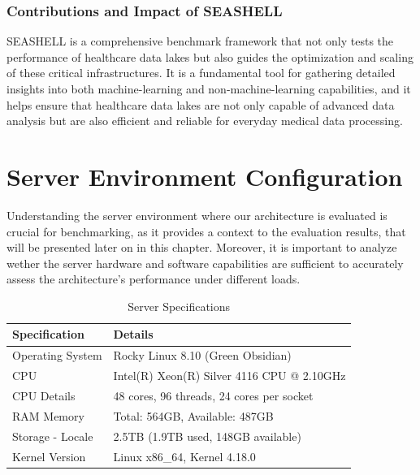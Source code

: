 \subsubsection{Contributions and Impact of SEASHELL}
SEASHELL is a comprehensive benchmark framework that not only tests the performance of healthcare data lakes but also guides the optimization and scaling of these critical infrastructures. It is a fundamental tool for gathering detailed insights into both machine-learning and non-machine-learning capabilities, and it helps ensure that healthcare data lakes are not only capable of advanced data analysis but are also efficient and reliable for everyday medical data processing.


\section{Server Environment Configuration}

Understanding the server environment where our architecture is evaluated is crucial for benchmarking, as it provides a context to the evaluation results, that will be presented later on in this chapter. Moreover, it is important to analyze wether the server hardware and software capabilities are sufficient to accurately assess the architecture's performance under different loads.

\begin{table}[h!]
    \centering
    \begin{tabular}{| P{0.47\textwidth} | P{0.47\textwidth} |}
    \hline
    \textbf{Specification}         & \textbf{Details}                         \\ \hline
    Operating System               & Rocky Linux 8.10 (Green Obsidian)        \\ \hline
    CPU                            & Intel(R) Xeon(R) Silver 4116 CPU @ 2.10GHz \\ \hline
    CPU Details                    & 48 cores, 96 threads, 24 cores per socket \\ \hline
    RAM Memory                         & Total: 564GB, Available: 487GB \\ \hline
    Storage - Locale               & 2.5TB (1.9TB used, 148GB available)       \\ \hline
    Kernel Version                 & Linux x86\_64, Kernel 4.18.0              \\ \hline
    \end{tabular}
    \caption{Server Specifications}
    \label{tab:server_specs}
\end{table}

